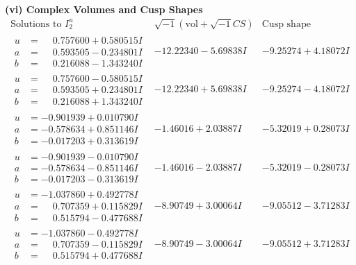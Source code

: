 \documentclass[1p]{elsarticle_modified}
\theoremstyle{definition}
\newcommand{\I}{\sqrt{-1}}
\begin{document}
\newpage\flushleft \textbf{(vi) Complex Volumes and Cusp Shapes}
$$\begin{array}{c|c|c}  
\text{Solutions to }I^u_{2}& \I (\text{vol} + \sqrt{-1}CS) & \text{Cusp shape}\\
 \hline 
\begin{aligned}
u &= \phantom{-}0.757600 + 0.580515 I \\
a &= \phantom{-}0.593505 - 0.234801 I \\
b &= \phantom{-}0.216088 - 1.343240 I\end{aligned}
 & -12.22340 - 5.69838 I & -9.25274 + 4.18072 I \\ \hline\begin{aligned}
u &= \phantom{-}0.757600 - 0.580515 I \\
a &= \phantom{-}0.593505 + 0.234801 I \\
b &= \phantom{-}0.216088 + 1.343240 I\end{aligned}
 & -12.22340 + 5.69838 I & -9.25274 - 4.18072 I \\ \hline\begin{aligned}
u &= -0.901939 + 0.010790 I \\
a &= -0.578634 + 0.851146 I \\
b &= -0.017203 + 0.313619 I\end{aligned}
 & -1.46016 + 2.03887 I & -5.32019 + 0.28073 I \\ \hline\begin{aligned}
u &= -0.901939 - 0.010790 I \\
a &= -0.578634 - 0.851146 I \\
b &= -0.017203 - 0.313619 I\end{aligned}
 & -1.46016 - 2.03887 I & -5.32019 - 0.28073 I \\ \hline\begin{aligned}
u &= -1.037860 + 0.492778 I \\
a &= \phantom{-}0.707359 + 0.115829 I \\
b &= \phantom{-}0.515794 - 0.477688 I\end{aligned}
 & -8.90749 + 3.00064 I & -9.05512 - 3.71283 I \\ \hline\begin{aligned}
u &= -1.037860 - 0.492778 I \\
a &= \phantom{-}0.707359 - 0.115829 I \\
b &= \phantom{-}0.515794 + 0.477688 I\end{aligned}
 & -8.90749 - 3.00064 I & -9.05512 + 3.71283 I \\ \hline\begin{aligned}

\end{aligned}
\end{array}$$
\end{document}
